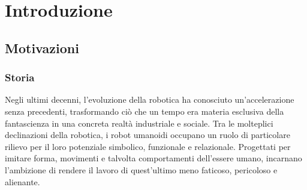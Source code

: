 \section{Introduzione}

\subsection{Motivazioni}

\subsubsection{Storia}
Negli ultimi decenni, l'evoluzione della robotica ha conosciuto un'accelerazione senza precedenti, trasformando ciò che un tempo era materia esclusiva della fantascienza in una concreta realtà industriale e sociale. Tra le molteplici declinazioni della robotica, i robot umanoidi occupano un ruolo di particolare rilievo per il loro potenziale simbolico, funzionale e relazionale. Progettati per imitare forma, movimenti e talvolta comportamenti dell'essere umano, incarnano l'ambizione di rendere il lavoro di quest'ultimo meno faticoso, pericoloso e alienante. 

